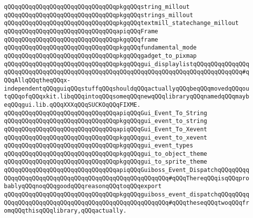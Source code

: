 \verb|qQQqqQQqqQQqqQQqqQQqqQQqqQQqqQQqpkgqQQqstring_millout|\newline
\verb|qQQqqQQqqQQqqQQqqQQqqQQqqQQqqQQqpkgqQQqstrings_millout|\newline
\verb|qQQqqQQqqQQqqQQqqQQqqQQqqQQqqQQqpkgqQQqtextmill_statechange_millout|\newline
\newline
\verb|qQQqqQQqqQQqqQQqqQQqqQQqqQQqqQQqapiqQQqFrame|\newline
\verb|qQQqqQQqqQQqqQQqqQQqqQQqqQQqqQQqpkgqQQqframe|\newline
\newline
\verb|qQQqqQQqqQQqqQQqqQQqqQQqqQQqqQQqpkgqQQqfundamental_mode|\newline
\verb|qQQqqQQqqQQqqQQqqQQqqQQqqQQqqQQqpkgqQQqgadget_to_pixmap|\newline
\verb|qQQqqQQqqQQqqQQqqQQqqQQqqQQqqQQqpkgqQQqgui_displaylistqQQqqQQqqQQqqQQqqQQqqQQqqQQqqQQqqQQqqQQqqQQqqQQqqQQqqQQqqQQqqQQqqQQqqQQqqQQqqQQqqQQq#qQQqAllqQQqtheqQQqx-independentqQQqguiqQQqstuffqQQqshouldqQQqactuallyqQQqbeqQQqmovedqQQqoutqQQqofqQQqxkit.libqQQqintoqQQqsomeqQQqnewqQQqlibraryqQQqnamedqQQqmaybeqQQqgui.lib.qQQqXXXqQQqSUCKOqQQqFIXME.|\newline
\newline
\verb|qQQqqQQqqQQqqQQqqQQqqQQqqQQqqQQqapiqQQqGui_Event_To_String|\newline
\verb|qQQqqQQqqQQqqQQqqQQqqQQqqQQqqQQqpkgqQQqgui_event_to_string|\newline
\newline
\verb|qQQqqQQqqQQqqQQqqQQqqQQqqQQqqQQqapiqQQqGui_Event_To_Xevent|\newline
\verb|qQQqqQQqqQQqqQQqqQQqqQQqqQQqqQQqpkgqQQqgui_event_to_xevent|\newline
\newline
\verb|qQQqqQQqqQQqqQQqqQQqqQQqqQQqqQQqpkgqQQqgui_event_types|\newline
\verb|qQQqqQQqqQQqqQQqqQQqqQQqqQQqqQQqpkgqQQqgui_to_object_theme|\newline
\verb|qQQqqQQqqQQqqQQqqQQqqQQqqQQqqQQqpkgqQQqgui_to_sprite_theme|\newline
\newline
\verb|qQQqqQQqqQQqqQQqqQQqqQQqqQQqqQQqapiqQQqGuiboss_Event_DispatchqQQqqQQqqQQqqQQqqQQqqQQqqQQqqQQqqQQqqQQqqQQqqQQqqQQqqQQq#qQQqThereqQQqisqQQqprobablyqQQqnoqQQqgoodqQQqreasonqQQqtoqQQqexport|\newline
\verb|qQQqqQQqqQQqqQQqqQQqqQQqqQQqqQQqpkgqQQqguiboss_event_dispatchqQQqqQQqqQQqqQQqqQQqqQQqqQQqqQQqqQQqqQQqqQQqqQQqqQQqqQQq#qQQqtheseqQQqtwoqQQqfromqQQqthisqQQqlibrary,qQQqactually.|\newline
